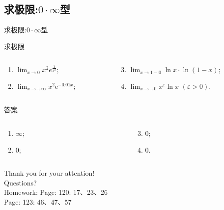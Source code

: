 \documentclass[
10pt,
aspectratio=43,
]{beamer}
\begin{document}
\subsection{求极限:$\displaystyle0\cdot\infty$型}
\begin{frame}{求极限:$\displaystyle0\cdot\infty$型}
	\everymath{\displaystyle}
	\begin{block}{求极限}
		\begin{columns}[t]
			\begin{column}{0.5\textwidth}
				\begin{enumerate}
					\item $\lim_{x \rightarrow 0} x^2 e^{\frac{1}{x^2}}$;
					\item $\lim_{x \rightarrow +\infty} x^2 \mathrm{e}^{-0.01 x}$;
				\end{enumerate}
			\end{column}
			\begin{column}{0.5\textwidth}
				\begin{enumerate}
					\setcounter{enumi}{2}
					\item $\lim_{x \rightarrow 1-0} \ln x \cdot \ln (1-x)$;
					\item $\lim_{x \rightarrow +0} x^{\varepsilon} \ln x \,\,(\varepsilon>0)$.
				\end{enumerate}
			\end{column}
		\end{columns}
	\end{block}

	\begin{exampleblock}{答案}
		\begin{columns}[t]
			\begin{column}{0.5\textwidth}
				\begin{enumerate}
					\pause
					\item $\infty$;
					\item $0$;
				\end{enumerate}
			\end{column}
			\begin{column}{0.5\textwidth}
				\begin{enumerate}
					\setcounter{enumi}{2}
					\pause
					\item $0$;
					\item $0$.
				\end{enumerate}
			\end{column}
		\end{columns}
	\end{exampleblock}
\end{frame}


\begin{frame}[plain]
	\vfill
	\centering
	{
		\centering \Huge \color{white} Thank you for your attention!\\[10pt]Questions?\\Homework: Page: 120: 17、23、26\\\vspace{0.4cm}Page: 123:  46、47、57
	}
	\vfill
\end{frame}
\end{document}

